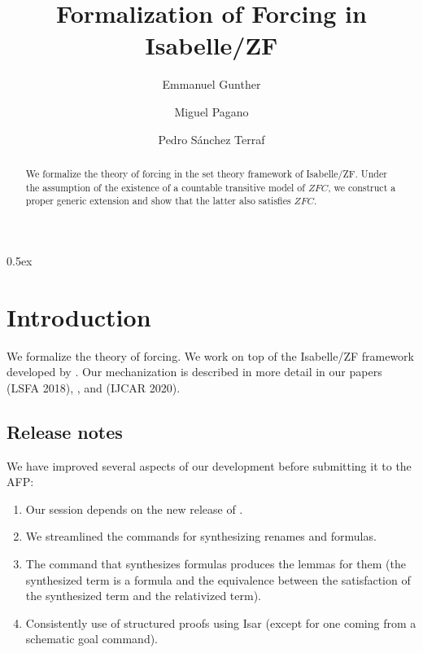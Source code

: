 \documentclass[11pt,a4paper]{article}
\newcommand{\axiomas}[1]{\mathit{#1}}
\newcommand{\ZFC}{\axiomas{ZFC}}
\begin{document}
\title{Formalization of Forcing in Isabelle/ZF}
\author{Emmanuel Gunther
  \and
  Miguel Pagano
  \and
  Pedro S\'anchez Terraf
}
\maketitle

\begin{abstract}
We formalize the theory of forcing in the set theory framework of
Isabelle/ZF. Under the assumption of the existence of a countable
transitive model of $\ZFC$, we construct a proper generic extension and show
that the latter also satisfies $\ZFC$.
\end{abstract}


\tableofcontents

\parindent 0pt\parskip 0.5ex

\section{Introduction}
We formalize the theory of forcing. We work on top of the Isabelle/ZF
framework developed by \citet{DBLP:journals/jar/PaulsonG96}. Our
mechanization is described in more detail in our papers
\cite{2018arXiv180705174G} (LSFA 2018), \cite{2019arXiv190103313G},
and \cite{2020arXiv200109715G} (IJCAR 2020).

\subsection*{Release notes}
\label{sec:release-notes}

We have improved several aspects of our development before submitting
it to the AFP:
\begin{enumerate}
\item Our session  depends on the new release of
  .
\item We streamlined the commands for synthesizing renames and formulas.
\item The command that synthesizes formulas produces the lemmas for
  them (the synthesized term is a formula and the equivalence between
  the satisfaction of the synthesized term and the relativized term).
\item Consistently use of structured proofs using Isar (except for one
  coming from a schematic goal command).
\end{enumerate}





\end{document}
